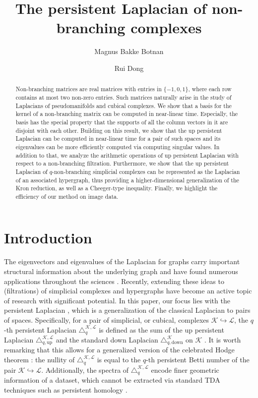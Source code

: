 \documentclass{article}
\date{} %
\title{The persistent Laplacian of non-branching complexes}
\author[1]{Magnus Bakke Botnan}
\author[1]{Rui Dong}
\affil[1]{Department of Mathematics, Vrije Universiteit Amsterdam, The Netherlands}
\newcommand{\Email}[1]{\ifthenelse{\equal{#1}{}}{}{\par\noindent {\rm E-mail: }{\it  #1} \par}}
\newcommand{\Address}[1]{\vspace{2mm}\par\noindent {\it #1} \par}
\theoremstyle{definition}
\newcommand{\KK}{\mathcal{K}}
\newcommand{\LL}{\mathcal{L}}
\begin{document}
\maketitle






\begin{abstract}
Non-branching matrices are real matrices with entries in $\{-1,0,1\}$, where each row contains at most two non-zero entries. Such matrices naturally arise in the study of Laplacians of pseudomanifolds and cubical complexes. 
We show that a basis for the kernel of a non-branching matrix can be computed in near-linear time. 
Especially,
the basis has the special property that the supports of all the column vectors in it are disjoint with each other.
Building on this result, we show that the up persistent Laplacian can be computed in near-linear time for a pair of such spaces and its eigenvalues can be more efficiently computed via computing singular values.
In addition to that,
we analyze the arithmetic operations of up persistent Laplacian with respect to a non-branching filtration.
Furthermore, we show that the up persistent Laplacian of $q$-non-branching simplicial complexes can be represented as the Laplacian of an associated hypergraph, thus providing a higher-dimensional generalization of the Kron reduction,
as well as a Cheeger-type inequality.
Finally, we highlight the efficiency of our method on image data.
\end{abstract}


\section{Introduction}
The eigenvectors and eigenvalues of the Laplacian for graphs carry important structural information about the underlying graph and have found numerous applications throughout the sciences \cite{von2007tutorial,lim2020hodge}. Recently, extending these ideas to (filtrations) of simplicial complexes and hypergraphs have become an active topic of research with significant potential. In this paper, our focus lies with the persistent Laplacian  \cite{MR4164275, pers_lap,gen_pers_lap}, which is a generalization of the classical Laplacian to pairs of spaces. Specifically, for a pair of simplicial, or cubical, complexes $\KK \hookrightarrow \LL$, the $q$-th persistent Laplacian $\triangle_q^{\KK, \LL}$ is defined as the sum of the up persistent Laplacian $\triangle_{q, \mathrm{up}}^{\KK, \LL}$ and the standard down Laplacian $\triangle_{q, \mathrm{down}}^{\KK}$ on $\KK$ . It is worth remarking that this allows for a generalized version of the celebrated Hodge theorem \cite{pers_lap}: the nullity of $\triangle_q^{\KK, \LL}$ is equal to the $q$-th persistent Betti number of the pair $\KK \hookrightarrow \LL$. Additionally, the spectra of $\triangle_q^{\KK, \LL}$ encode finer geometric information of a dataset, which cannot be extracted via standard TDA techniques such as persistent homology \cite{davies23c,wei2023}. 
\end{document}
